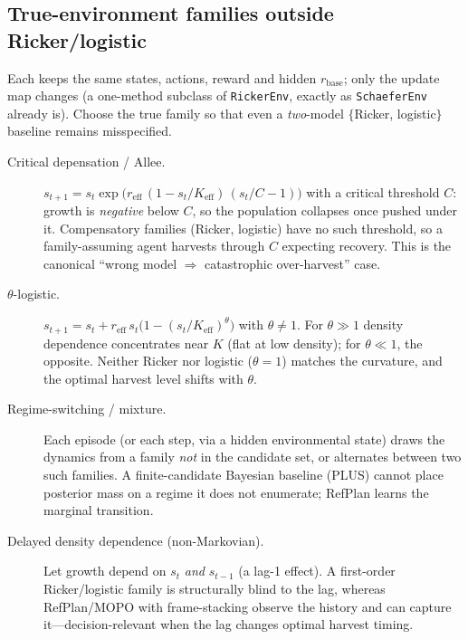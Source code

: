 \documentclass[11pt]{article}
\newcommand{\reff}{r_{\mathrm{eff}}}
\newcommand{\Keff}{K_{\mathrm{eff}}}
\newcommand{\rbase}{r_{\mathrm{base}}}
\begin{document}
\subsection{True-environment families outside Ricker/logistic}
Each keeps the same states, actions, reward and hidden $\rbase$; only the update
map changes (a one-method subclass of \texttt{RickerEnv}, exactly as
\texttt{SchaeferEnv} already is). Choose the true family so that even a
\emph{two}-model $\{$Ricker, logistic$\}$ baseline remains misspecified.
\begin{description}
  \item[Critical depensation / Allee.]
  $s_{t+1} = s_t \exp\!\big(\reff\,(1 - s_t/\Keff)\,(s_t/C - 1)\big)$ with a
  critical threshold $C$: growth is \emph{negative} below $C$, so the population
  collapses once pushed under it. Compensatory families (Ricker, logistic) have no
  such threshold, so a family-assuming agent harvests through $C$ expecting
  recovery. This is the canonical ``wrong model $\Rightarrow$ catastrophic
  over-harvest'' case.
  \item[$\theta$-logistic.]
  $s_{t+1} = s_t + \reff\, s_t\big(1 - (s_t/\Keff)^{\theta}\big)$ with
  $\theta \neq 1$. For $\theta \gg 1$ density dependence concentrates near $K$
  (flat at low density); for $\theta \ll 1$, the opposite. Neither Ricker nor
  logistic ($\theta{=}1$) matches the curvature, and the optimal harvest level
  shifts with $\theta$.
  \item[Regime-switching / mixture.] Each episode (or each step, via a hidden
  environmental state) draws the dynamics from a family \emph{not} in the candidate
  set, or alternates between two such families. A finite-candidate Bayesian
  baseline (PLUS) cannot place posterior mass on a regime it does not enumerate;
  RefPlan learns the marginal transition.
  \item[Delayed density dependence (non-Markovian).] Let growth depend on $s_t$
  \emph{and} $s_{t-1}$ (a lag-1 effect). A first-order Ricker/logistic family is
  structurally blind to the lag, whereas RefPlan/MOPO with frame-stacking observe
  the history and can capture it---decision-relevant when the lag changes optimal
  harvest timing.
\end{description}
\end{document}
